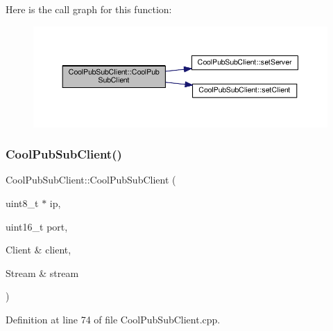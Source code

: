 Here is the call graph for this function\+:
\nopagebreak
\begin{figure}[H]
\begin{center}
\leavevmode
\includegraphics[width=350pt]{class_cool_pub_sub_client_a15e4dd41ebda943c377539086f70469d_cgraph}
\end{center}
\end{figure}
\mbox{\label{class_cool_pub_sub_client_a3e7d7fa4b55e36f0ac8912335993d650}} 
\subsubsection{\texorpdfstring{Cool\+Pub\+Sub\+Client()}{CoolPubSubClient()}\hspace{0.1cm}{\footnotesize\ttfamily [8/14]}}
{\footnotesize\ttfamily Cool\+Pub\+Sub\+Client\+::\+Cool\+Pub\+Sub\+Client (\begin{DoxyParamCaption}\item[{uint8\+\_\+t $\ast$}]{ip,  }\item[{uint16\+\_\+t}]{port,  }\item[{Client \&}]{client,  }\item[{Stream \&}]{stream }\end{DoxyParamCaption})}



Definition at line 74 of file Cool\+Pub\+Sub\+Client.\+cpp.

